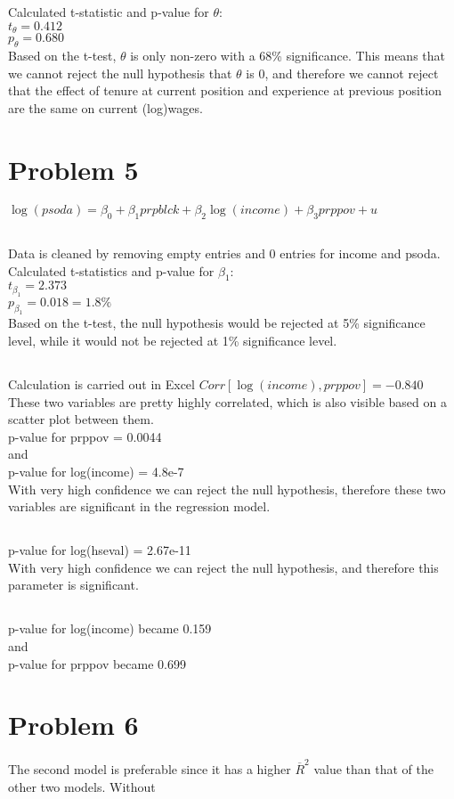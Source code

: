 \documentclass[11pt, oneside]{article}   	%
\begin{document}
\subsection{}
Calculated t-statistic and p-value for $\theta$: \\
\indent$t_\theta=0.412$\\
\indent$p_\theta=0.680$\\
Based on the t-test, $\theta$ is only non-zero with a 68\% significance. This means that we cannot reject the null hypothesis that $\theta$ is 0, and therefore we cannot reject that the effect of tenure at current position and experience at previous position are the same on current (log)wages.

\section{Problem 5}
$\log(psoda)=\beta_0+\beta_1prpblck+\beta_2\log(income)+\beta_3prppov+u$\\
\subsection{}
Data is cleaned by removing empty entries and 0 entries for income and psoda.
Calculated t-statistics and p-value for $\beta_1$:\\
\indent$t_{\beta_1}=2.373$\\
\indent$p_{\beta_1}=0.018=1.8\%$\\
Based on the t-test, the null hypothesis would be rejected at 5\% significance level, while it would not be rejected at 1\% significance level.
\subsection{}
Calculation is carried out in Excel
$Corr[\log(income),prppov]=-0.840$\\
These two variables are pretty highly correlated, which is also visible based on a scatter plot between them.\\
p-value for prppov = 0.0044\\ and \\
p-value for log(income) = 4.8e-7\\
With very high confidence we can reject the null hypothesis, therefore these two variables are significant in the regression model.
\subsection{}
p-value for log(hseval) = 2.67e-11\\
With very high confidence we can reject the null hypothesis, and therefore this parameter is significant.
\subsection{}
p-value for log(income) became 0.159\\ and \\
p-value for prppov became 0.699\\

\section{Problem 6}
The second model is preferable since it has a higher $\overline{R}^2$ value than that of the other two models. Without
\end{document}
